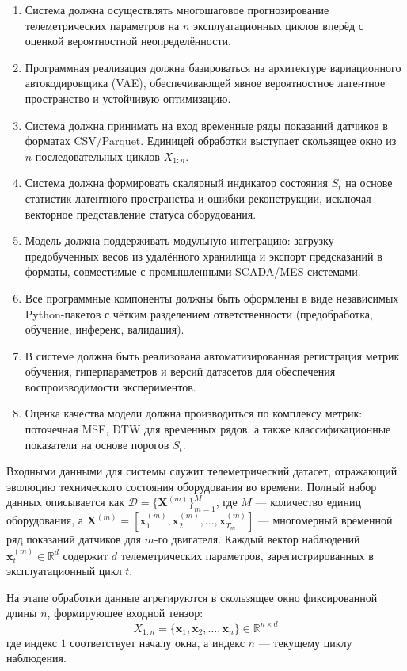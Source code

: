 \documentclass[14pt, a4paper, oneside]{extreport}
\begin{document}
\begin{enumerate}
\item Система должна осуществлять многошаговое прогнозирование телеметрических параметров на $n$ эксплуатационных циклов вперёд с оценкой вероятностной неопределённости.
\item Программная реализация должна базироваться на архитектуре вариационного автокодировщика (VAE), обеспечивающей явное вероятностное латентное пространство и устойчивую оптимизацию.
\item Система должна принимать на вход временные ряды показаний датчиков в форматах CSV/Parquet. Единицей обработки выступает скользящее окно из $n$ последовательных циклов $X_{1:n}$.
\item Система должна формировать скалярный индикатор состояния $S_t$ на основе статистик латентного пространства и ошибки реконструкции, исключая векторное представление статуса оборудования.
\item Модель должна поддерживать модульную интеграцию: загрузку предобученных весов из удалённого хранилища и экспорт предсказаний в форматы, совместимые с промышленными SCADA/MES-системами.
\item Все программные компоненты должны быть оформлены в виде независимых Python-пакетов с чётким разделением ответственности (предобработка, обучение, инференс, валидация).
\item В системе должна быть реализована автоматизированная регистрация метрик обучения, гиперпараметров и версий датасетов для обеспечения воспроизводимости экспериментов.
\item Оценка качества модели должна производиться по комплексу метрик: поточечная MSE, DTW для временных рядов, а также классификационные показатели на основе порогов $S_t$.
\end{enumerate}

Входными данными для системы служит телеметрический датасет, отражающий эволюцию технического состояния оборудования во времени. Полный набор данных описывается как $\mathcal{D} = \{ \mathbf{X}^{(m)} \}_{m=1}^{M}$, где $M$ — количество единиц оборудования, а $\mathbf{X}^{(m)} = [\mathbf{x}_1^{(m)}, \mathbf{x}_2^{(m)}, \dots, \mathbf{x}_{T_m}^{(m)}]$ — многомерный временной ряд показаний датчиков для $m$-го двигателя. Каждый вектор наблюдений $\mathbf{x}_t^{(m)} \in \mathbb{R}^d$ содержит $d$ телеметрических параметров, зарегистрированных в эксплуатационный цикл $t$.

На этапе обработки данные агрегируются в скользящее окно фиксированной длины $n$, формирующее входной тензор:
\begin{equation}
X_{1:n} = \{ \mathbf{x}_1, \mathbf{x}_2, \dots, \mathbf{x}_n \} \in \mathbb{R}^{n \times d}
\end{equation}
где индекс $1$ соответствует началу окна, а индекс $n$ — текущему циклу наблюдения.
\end{document}
